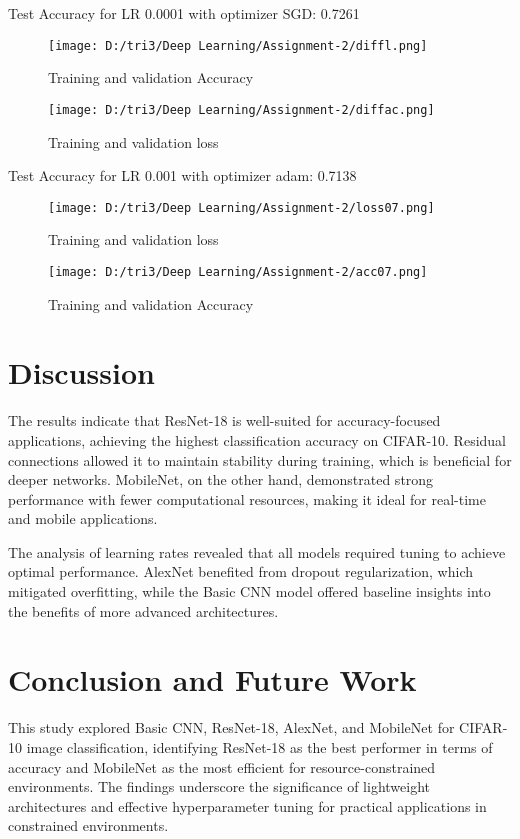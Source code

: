 \documentclass[10pt,twocolumn,letterpaper]{article}
\begin{document}
Test Accuracy for LR 0.0001 with optimizer SGD: 0.7261

\begin{figure}[H]
    \centering
    \texttt{[image: D:/tri3/Deep Learning/Assignment-2/diffl.png]}
    \caption{Training and validation Accuracy }
    \label{fig1: Implementation of AlexNet}
\end{figure}
\begin{figure}[H]
    \centering
    \texttt{[image: D:/tri3/Deep Learning/Assignment-2/diffac.png]}
    \caption{Training and validation loss }
    \label{fig1: Implementation of AlexNet}
\end{figure}
Test Accuracy for LR 0.001 with optimizer adam: 0.7138
\begin{figure}[H]
    \centering
    \texttt{[image: D:/tri3/Deep Learning/Assignment-2/loss07.png]}
    \caption{Training and validation loss}
    \label{fig1: Implementation of AlexNet}
\end{figure}
\begin{figure}[H]
    \centering
    \texttt{[image: D:/tri3/Deep Learning/Assignment-2/acc07.png]}
    \caption{Training and validation Accuracy }
    \label{fig1: Implementation of AlexNet}
\end{figure}
\section{Discussion}
The results indicate that ResNet-18 is well-suited for accuracy-focused applications, achieving the highest classification accuracy on CIFAR-10. Residual connections allowed it to maintain stability during training, which is beneficial for deeper networks. MobileNet, on the other hand, demonstrated strong performance with fewer computational resources, making it ideal for real-time and mobile applications.

The analysis of learning rates revealed that all models required tuning to achieve optimal performance. AlexNet benefited from dropout regularization, which mitigated overfitting, while the Basic CNN model offered baseline insights into the benefits of more advanced architectures.
\section{Conclusion and Future Work}This study explored Basic CNN, ResNet-18, AlexNet, and MobileNet for CIFAR-10 image classification, identifying ResNet-18 as the best performer in terms of accuracy and MobileNet as the most efficient for resource-constrained environments. The findings underscore the significance of lightweight architectures and effective hyperparameter tuning for practical applications in constrained environments.
\end{document}
